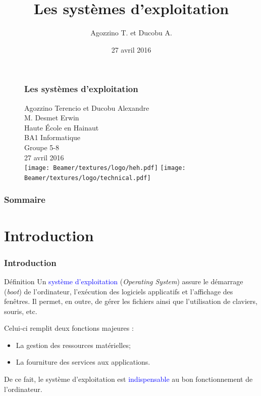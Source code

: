 \documentclass[aspectratio=169]{beamer}
\title{Les systèmes d'exploitation}
\author{Agozzino T. et Ducobu A.}
\institute{HEH}
\date{27 avril 2016}
\begin{document}
\begin{frame}
    \begin{figure}
      \frametitle{Les systèmes d'exploitation}
      Agozzino Terencio et Ducobu Alexandre \\
      M. Desmet Erwin \\
      Haute École en Hainaut \\
      BA1 Informatique \\
      Groupe 5-8 \\
      27 avril 2016 \\
      \vspace{1cm}
      \texttt{[image: Beamer/textures/logo/heh.pdf]}
      \texttt{[image: Beamer/textures/logo/technical.pdf]}
    \end{figure}
\end{frame}

\begin{frame}
  \frametitle{Sommaire}
  \tableofcontents
\end{frame}

\section{Introduction}
\begin{frame}
\frametitle{Introduction}
\begin{block}{Définition}
  Un \textcolor{blue}{système d'exploitation} (\textit{Operating System})
assure le démarrage (\textit{boot}) de l'ordinateur, l'exécution des logiciels
applicatifs et l'affichage des fenêtres. Il permet, en outre, de gérer les
fichiers ainsi que l'utilisation de claviers, souris, etc.
\end{block}

\hspace{0.5cm}

Celui-ci remplit deux fonctions majeures :

\begin{itemize}
  \item La gestion des ressources matérielles;

  \item La fourniture des services aux applications.
\end{itemize}

\hspace{0.5cm}

De ce fait, le système d'exploitation est \textcolor{blue}{indispensable} au
bon fonctionnement de l'ordinateur.
\end{frame}
\end{document}
